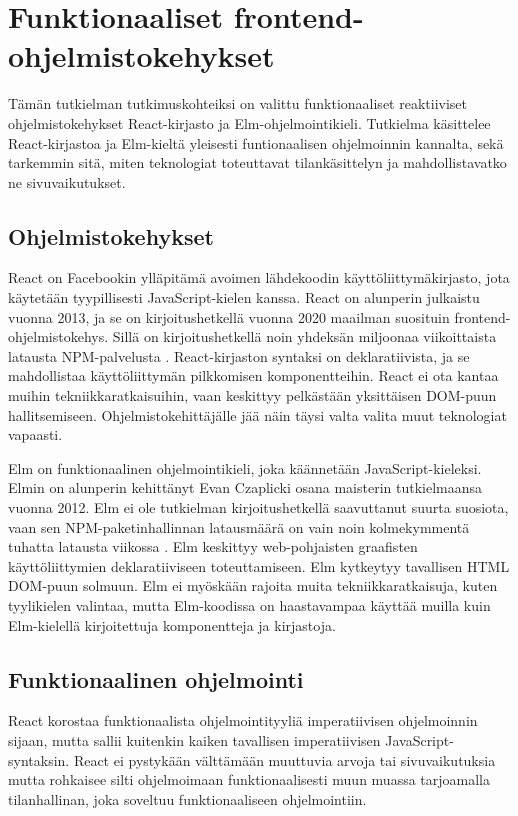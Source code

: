 \chapter{Funktionaaliset frontend-ohjelmistokehykset}
Tämän tutkielman tutkimuskohteiksi on valittu funktionaaliset reaktiiviset ohjelmistokehykset React-kirjasto ja
Elm-ohjelmointikieli. Tutkielma käsittelee React-kirjastoa ja Elm-kieltä yleisesti funtionaalisen ohjelmoinnin kannalta,
sekä tarkemmin sitä, miten teknologiat toteuttavat tilankäsittelyn ja mahdollistavatko ne sivuvaikutukset.

\section{Ohjelmistokehykset}
React on Facebookin ylläpitämä avoimen lähdekoodin käyttöliittymäkirjasto, jota käytetään tyypillisesti
JavaScript-kielen kanssa. React on alunperin julkaistu vuonna 2013, ja se on kirjoitushetkellä vuonna 2020 maailman
suosituin frontend-ohjelmistokehys. Sillä on kirjoitushetkellä noin yhdeksän miljoonaa viikoittaista latausta
NPM-palvelusta \cite{npmtrends}. React-kirjaston syntaksi on deklaratiivista, ja se mahdollistaa käyttöliittymän
pilkkomisen komponentteihin. React ei ota kantaa muihin tekniikkaratkaisuihin, vaan keskittyy pelkästään yksittäisen
DOM-puun hallitsemiseen. Ohjelmistokehittäjälle jää näin täysi valta valita muut teknologiat vapaasti. \cite{reactjs}

Elm on funktionaalinen ohjelmointikieli, joka käännetään JavaScript-kieleksi. Elmin on alunperin kehittänyt Evan
Czaplicki osana maisterin tutkielmaansa vuonna 2012. Elm ei ole tutkielman kirjoitushetkellä saavuttanut suurta
suosiota, vaan sen NPM-paketinhallinnan latausmäärä on vain noin kolmekymmentä tuhatta latausta viikossa
\cite{npmtrends}. Elm keskittyy web-pohjaisten graafisten käyttöliittymien deklaratiiviseen toteuttamiseen. Elm
kytkeytyy tavallisen HTML DOM-puun solmuun. Elm ei myöskään rajoita muita tekniikkaratkaisuja, kuten tyylikielen
valintaa, mutta Elm-koodissa on haastavampaa käyttää muilla kuin Elm-kielellä kirjoitettuja komponentteja ja kirjastoja.
\cite{elmlang}

\section{Funktionaalinen ohjelmointi}
React korostaa funktionaalista ohjelmointityyliä imperatiivisen ohjelmoinnin sijaan, mutta sallii kuitenkin kaiken
tavallisen imperatiivisen JavaScript-syntaksin. React ei pystykään välttämään muuttuvia arvoja tai sivuvaikutuksia mutta
rohkaisee silti ohjelmoimaan funktionaalisesti muun muassa tarjoamalla tilanhallinan, joka soveltuu funktionaaliseen
ohjelmointiin. \cite{reactjs}


